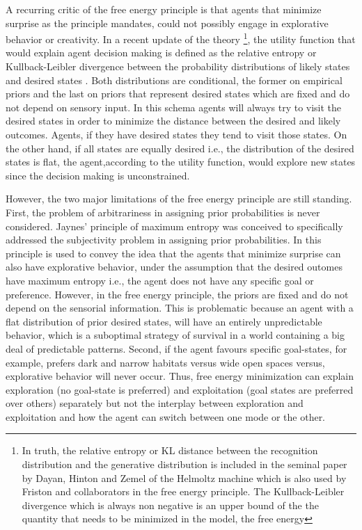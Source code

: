 \documentclass[11pt, onecolumn]{article}
\begin{document}
A recurring critic of the free energy principle is that agents that minimize surprise as the principle mandates, could not possibly engage in explorative  behavior or creativity. In a recent update of the theory \footnote{In truth, the relative entropy or KL distance between the recognition distribution and the generative distribution is included in the seminal paper by Dayan, Hinton and Zemel of the Helmoltz machine \citep{dayan_helmholtz_1995} which is also used by Friston and collaborators in the free energy principle. The Kullback-Leibler divergence which is always non negative is an upper
bound of the the quantity that needs to be minimized in the model, the free energy}, the utility function that would explain agent decision making is defined as the relative entropy or Kullback-Leibler divergence between the probability distributions of likely states and desired states \citep{schwartenbeck_exploration_2013}. Both distributions are conditional, the former on empirical priors and the last on priors that represent desired states which are fixed and do not depend on sensory input. In this schema agents will always try to visit the desired states in order to minimize the distance between the desired and likely outcomes. Agents, if they have desired states they tend to visit those states. On the other hand, if all states are equally desired i.e., the distribution of the desired states is flat, the agent,according to the utility function, would explore new states since the decision making is unconstrained.

However, the two major limitations  of the free energy principle are still standing. First, the problem of arbitrariness in assigning prior probabilities is 
never considered. Jaynes' \citep{Jaynes68priorprobabilities} principle of maximum entropy was conceived to specifically addressed the subjectivity problem in assigning prior probabilities. In \citep{schwartenbeck_exploration_2013} this principle is used to convey the idea that the agents that minimize surprise can also have explorative behavior, under the assumption that the desired outomes have maximum entropy i.e., the agent does not have any specific goal or preference. However, in the free energy principle, the priors are fixed and do not depend on the sensorial information. This is problematic because an agent with a flat distribution of prior desired states, will have an entirely unpredictable behavior, which is a suboptimal strategy of survival in a world containing a big deal of predictable patterns. Second, if the agent favours specific goal-states, for example, prefers dark and narrow habitats versus  wide open spaces versus, explorative behavior will never occur. Thus, free energy minimization can explain exploration (no goal-state is preferred) and exploitation (goal states are preferred over others) separately but not the interplay between exploration and exploitation and how the agent can switch between one mode or the other.
\end{document}
